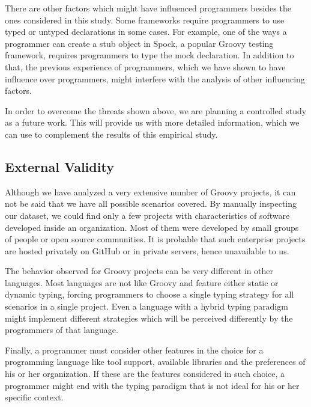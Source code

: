\documentclass[preprint]{sigplanconf}
\begin{document}
There are other factors which might have influenced programmers besides the ones considered in this study.
Some frameworks require programmers to use typed or untyped declarations in some cases.
For example, one of the ways a programmer can create a stub object in Spock, a popular Groovy testing framework, requires programmers to type the mock declaration.
In addition to that, the previous experience of programmers, which we have shown to have influence over programmers, might interfere with the analysis of other influencing factors.

In order to overcome the threats shown above, we are planning a controlled study as a future work.
This will provide us with more detailed information, which we can use to complement the results of this empirical study.

\subsection*{External Validity}
Although we have analyzed a very extensive number of Groovy projects, it can not be said that we have all possible scenarios covered.
By manually inspecting our dataset, we could find only a few projects with characteristics of software developed inside an organization.
Most of them were developed by small groups of people or open source communities.
It is probable that such enterprise projects are hosted privately on GitHub or in private servers, hence unavailable to us.

The behavior observed for Groovy projects can be very different in other languages.
Most languages are not like Groovy and feature either static or dynamic typing, forcing programmers to choose a single typing strategy for all scenarios in a single project.
Even a language with a hybrid typing paradigm might implement different strategies which will be perceived differently by the programmers of that language.

Finally, a programmer must consider other features in the choice for a programming language like tool support, available libraries and the preferences of his or her organization.
If these are the features considered in such choice, a programmer might end with the typing paradigm that is not ideal for his or her specific context.











%
%
\end{document}
